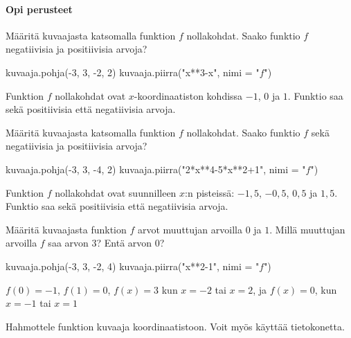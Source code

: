 \begin{tehtavasivu}


\paragraph*{Opi perusteet}
\begin{tehtava}
Määritä kuvaajasta katsomalla funktion \(f\) nollakohdat. Saako funktio \(f\) negatiivisia ja positiivisia arvoja?
\begin{kuva}
    kuvaaja.pohja(-3, 3, -2, 2)
    kuvaaja.piirra("x**3-x", nimi = "$f$")
\end{kuva}
\begin{vastaus}
Funktion $f$ nollakohdat ovat $x$-koordinaatiston kohdissa $-1$, $0$ ja $1$. Funktio saa sekä positiivisia että negatiivisia arvoja.
\end{vastaus}
\end{tehtava}

\begin{tehtava}
Määritä kuvaajasta katsomalla funktion $f$ nollakohdat. Saako funktio $f$ sekä negatiivisia ja positiivisia arvoja?
\begin{kuva}
    kuvaaja.pohja(-3, 3, -4, 2)
    kuvaaja.piirra("2*x**4-5*x**2+1", nimi = "$f$")
\end{kuva}
\begin{vastaus}
Funktion $f$ nollakohdat ovat suunnilleen $x$:n pisteissä: $-1,5$, $-0,5$, $0,5$ ja $1,5$. Funktio saa sekä positiivisia että negatiivisia arvoja.
\end{vastaus}
\end{tehtava}

\begin{tehtava}
Määritä kuvaajasta funktion $f$ arvot muuttujan arvoilla $0$ ja $1$. Millä muuttujan arvoilla $f$ saa arvon $3$? Entä arvon $0$?
\begin{kuva}
    kuvaaja.pohja(-3, 3, -2, 4)
    kuvaaja.piirra("x**2-1", nimi = "$f$")
\end{kuva}
\begin{vastaus}
 $f(0)=-1$, $f(1)=0$, $f(x)=3$ kun $x=-2$ tai $x=2$, ja $f(x)=0$, kun $x=-1$ tai $x=1$
\end{vastaus}
\end{tehtava}


\begin{tehtava}
Hahmottele funktion kuvaaja koordinaatistoon. Voit myös käyttää tietokonetta.


\end{tehtava}
\end{tehtavasivu}
